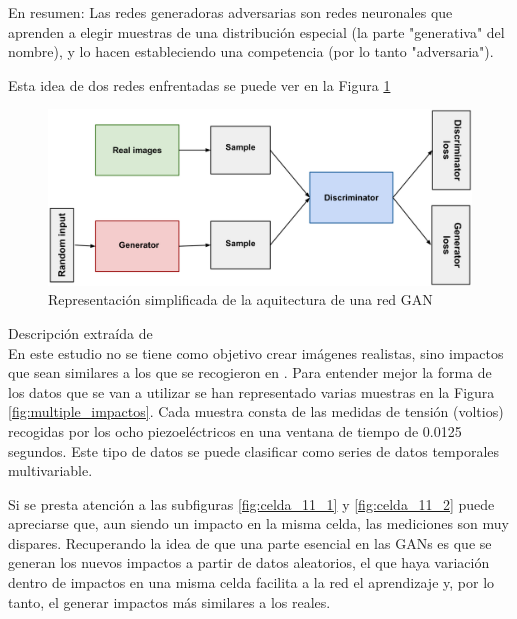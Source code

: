 En resumen: Las redes generadoras adversarias son redes neuronales que aprenden a elegir muestras de una distribución especial (la parte "generativa" del nombre), y lo hacen estableciendo una competencia (por lo tanto "adversaria"). 

Esta idea de dos redes enfrentadas se puede ver en la Figura \ref{fig:gan_arquitectura}

\begin{figure}[h!]
    \centering
    \includegraphics[width=125mm, angle=0]{4/Fotos/gan_representacion.png}
    \captionsetup{justification=centering,margin=1.25cm}
    \caption{Representación simplificada de la aquitectura de una red GAN}
    \label{fig:gan_arquitectura}
\end{figure}

Descripción extraída de \cite{GAN_lab}\\

En este estudio no se tiene como objetivo crear imágenes realistas, sino impactos que sean similares a los que se recogieron en \cite{Christian_TFM}. Para entender mejor la forma de los datos que se van a utilizar se han representado varias muestras en la Figura \ref{fig:multiple_impactos}. Cada muestra consta de las medidas de tensión (voltios) recogidas por los ocho piezoeléctricos en una ventana de tiempo de 0.0125 segundos. Este tipo de datos se puede clasificar como series de datos temporales multivariable.

Si se presta atención a las subfiguras \ref{fig:celda_11_1} y \ref{fig:celda_11_2} puede apreciarse que, aun siendo un impacto en la misma celda, las mediciones son muy dispares. Recuperando la idea de que una parte esencial en las GANs es que se generan los nuevos impactos a partir de datos aleatorios, el que haya variación dentro de impactos en una misma celda facilita a la red el aprendizaje y, por lo tanto, el generar impactos más similares a los reales.

